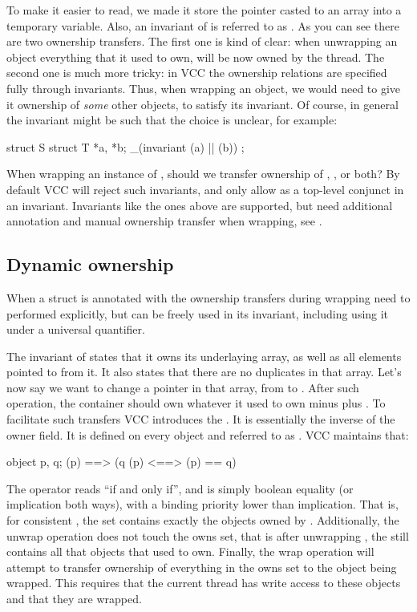 \noindent
To make it easier to read, we made it store the  pointer
casted to an array into a temporary variable.
Also, an invariant of  is referred to as .
As you can see there are two ownership transfers.
The first one is kind of clear: when unwrapping an object everything that it used
to own, will be now owned by the thread.
The second one is much more tricky: 
in VCC the ownership relations are specified fully through invariants.
Thus, when wrapping an object, we would need to give it ownership
of \emph{some} other objects, to satisfy its invariant.
Of course, in general the invariant might be such that the choice
is unclear, for example:
\begin{VCC}
struct S {
  struct T *a, *b;
  _(invariant \mine(a) || \mine(b))
};
\end{VCC}
When wrapping an instance of , should we transfer ownership of , , or both?
By default VCC will reject such invariants, and only allow 
as a top-level conjunct in an invariant.
Invariants like the ones above are supported, but need additional annotation
and manual ownership transfer when wrapping, see .


\subsection{Dynamic ownership}
\label{sect:dynamic-ownership}

When a struct is annotated with  the ownership transfers
during wrapping need to performed explicitly, but  can
be freely used in its invariant, including using it under a universal
quantifier.


\noindent
The invariant of  states that it owns its underlaying array,
as well as all elements pointed to from it.
It also states that there are no duplicates in that array.
Let's now say we want to change a pointer in that array,
from  to .
After such operation, the container should own whatever it used
to own minus  plus .
To facilitate such transfers VCC introduces the .
It is essentially the inverse of the owner field.
It is defined on every object  and referred to as .
VCC maintains that:
\begin{VCC}
\forall object p, q; \consistent(p) ==> 
  (q \in \owns(p) <==> \owner(p) == q)
\end{VCC}
The operator \vcc{<==>} reads ``if and only if'', and is simply boolean
equality (or implication both ways), with a binding priority lower than implication.
That is, for consistent , the set  contains exactly
the objects owned by .
Additionally, the unwrap operation does not touch the owns set,
that is after unwrapping , the  still contains
all that objects that  used to own.
Finally, the wrap operation will attempt to transfer ownership
of everything in the owns set to the object being wrapped.
This requires that the current thread has write access to these objects
and that they are wrapped.

